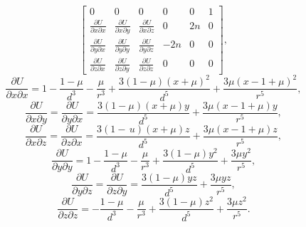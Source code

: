 \begin{equation}
\begin{bmatrix}
                            0                                       &   0                                       &   0                                       &   0   &   0   &   1   \\
                            \frac{\partial U}{\partial x\partial x} &   \frac{\partial U}{\partial x\partial y} &   \frac{\partial U}{\partial x\partial z} &   0   &   2n  &   0   \\
                            \frac{\partial U}{\partial y\partial x} &   \frac{\partial U}{\partial y\partial y} &   \frac{\partial U}{\partial y\partial z} &   -2n &   0   &   0   \\
                            \frac{\partial U}{\partial z\partial x} &   \frac{\partial U}{\partial z\partial y} &   \frac{\partial U}{\partial z\partial z} &   0   &   0   &   0   \end{bmatrix},
                            \label{eq:variationalJacobian}
\end{equation}
\begin{equation}
    \frac{\partial U}{\partial x\partial x}=1-\frac{1-\mu}{d^{3}}-\frac{\mu}{r^{3}}+\frac{3(1-\mu)(x+\mu)^{2}}{d^{5}}+\frac{3\mu(x-1+\mu)^{2}}{r^{5}},
    \label{eq:partialUpartialxx}
\end{equation}
\begin{equation}
    \frac{\partial U}{\partial x\partial y}=\frac{\partial U}{\partial y\partial x}=\frac{3(1-\mu)(x+\mu)y}{d^{5}}+\frac{3\mu(x-1+\mu)y}{r^{5}},
    \label{eq:partialUpartialxy}
\end{equation}
\begin{equation}
    \frac{\partial U}{\partial x\partial z}=\frac{\partial U}{\partial z\partial x}=\frac{3(1-\,u)(x+\mu)z}{d^{5}}+\frac{3\mu(x-1+\mu)z}{r^{5}},
    \label{eq:partialUpartialxz}
\end{equation}
\begin{equation}
    \frac{\partial U}{\partial y\partial y}=1-\frac{1-\mu}{d^{3}}-\frac{\mu}{r^{3}}+\frac{3(1-\mu)y^{2}}{d^{5}}+\frac{3\mu y^{2}}{r^{5}},
    \label{eq:partialUpartialyy}
\end{equation}
\begin{equation}
    \frac{\partial U}{\partial y\partial z}=\frac{\partial U}{\partial z\partial y}=\frac{3(1-\mu)yz}{d^{5}}+\frac{3\mu yz}{r^{5}},
    \label{eq:partialUpartialyz}
\end{equation}
\begin{equation}
    \frac{\partial U}{\partial z\partial z}=-\frac{1-\mu}{d^{3}}-\frac{\mu}{r^{3}}+\frac{3(1-\mu)z^{2}}{d^{5}}+\frac{3\mu z^{2}}{r^{5}}.
    \label{eq:partialUpartialzz}
\end{equation}

